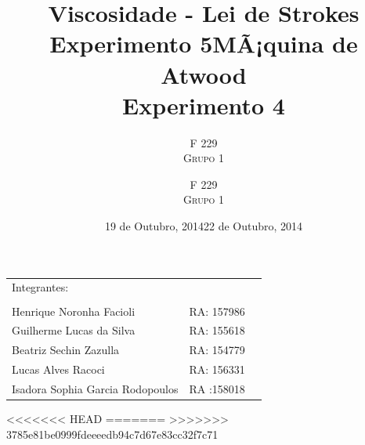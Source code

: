 \documentclass[a4paper]{article}
\title{Viscosidade - Lei de Strokes \\ Experimento 5} %
\author{F 229 \\ \textsc{Grupo 1}}
\date{19 de Outubro, 2014}
\title{MÃ¡quina de Atwood \\ Experimento 4} %
\author{F 229 \\ \textsc{Grupo 1}}
\date{22 de Outubro, 2014}
\begin{document}
\maketitle

\begin{center}
	\begin{tabular}{l r l}
		Integrantes:\\\\
		 Henrique Noronha Facioli & RA: 157986 \\
		 Guilherme Lucas da Silva & RA: 155618 \\
		 Beatriz Sechin Zazulla & RA: 154779 \\
		 Lucas Alves Racoci & RA: 156331 \\
		 Isadora Sophia Garcia Rodopoulos & RA :158018 \\
	\end{tabular}
\end{center}

<<<<<<< HEAD
=======
>>>>>>> 3785e81be0999fdeeeedb94c7d67e83cc32f7c71
\end{document}
